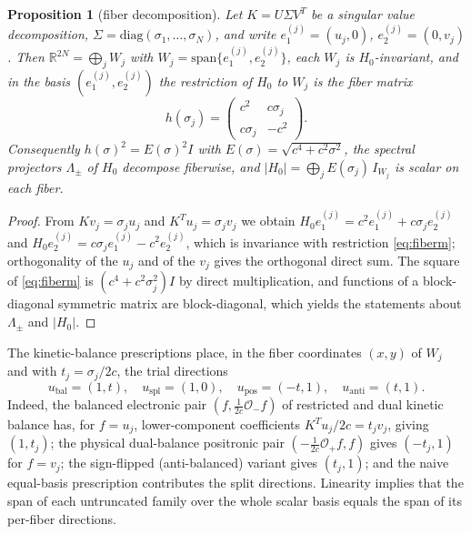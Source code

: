 \documentclass[11pt,reqno]{amsart}
\newtheorem{proposition}[theorem]{Proposition}
\theoremstyle{definition}
\theoremstyle{remark}
\newcommand{\R}{\mathbb{R}}
\newcommand{\Op}{\mathcal{O}}
\begin{document}
\begin{proposition}[fiber decomposition]\label{prop:fiber}
Let $K=U\Sigma V^{T}$ be a singular value decomposition,
$\Sigma=\mathrm{diag}(\sigma_{1},\dots,\sigma_{N})$, and write
$e_{1}^{(j)}=(u_{j},0)$, $e_{2}^{(j)}=(0,v_{j})$. Then
$\R^{2N}=\bigoplus_{j}W_{j}$ with
$W_{j}=\mathrm{span}\{e_{1}^{(j)},e_{2}^{(j)}\}$, each $W_{j}$ is
$H_{0}$-invariant, and in the basis $(e_{1}^{(j)},e_{2}^{(j)})$ the
restriction of $H_{0}$ to $W_{j}$ is the fiber matrix
\begin{equation}
h(\sigma_{j})=
\begin{pmatrix}
c^{2} & c\sigma_{j}\\
c\sigma_{j} & -c^{2}
\end{pmatrix}.
\label{eq:fiberm}
\end{equation}
Consequently $h(\sigma)^{2}=E(\sigma)^{2}I$ with
$E(\sigma)=\sqrt{c^{4}+c^{2}\sigma^{2}}$, the spectral projectors
$\Lambda_{\pm}$ of $H_{0}$ decompose fiberwise, and
$|H_{0}|=\bigoplus_{j}E(\sigma_{j})\,I_{W_{j}}$ is scalar on each fiber.
\end{proposition}

\begin{proof}
From $Kv_{j}=\sigma_{j}u_{j}$ and $K^{T}u_{j}=\sigma_{j}v_{j}$ we obtain
$H_{0}e_{1}^{(j)}=c^{2}e_{1}^{(j)}+c\sigma_{j}e_{2}^{(j)}$ and
$H_{0}e_{2}^{(j)}=c\sigma_{j}e_{1}^{(j)}-c^{2}e_{2}^{(j)}$, which is
invariance with restriction \eqref{eq:fiberm}; orthogonality of the
$u_{j}$ and of the $v_{j}$ gives the orthogonal direct sum. The square
of \eqref{eq:fiberm} is $(c^{4}+c^{2}\sigma_{j}^{2})I$ by direct
multiplication, and functions of a block-diagonal symmetric matrix are
block-diagonal, which yields the statements about $\Lambda_{\pm}$ and
$|H_{0}|$.
\end{proof}

The kinetic-balance prescriptions place, in the fiber coordinates
$(x,y)$ of $W_{j}$ and with $t_{j}=\sigma_{j}/2c$, the trial directions
\begin{equation}
u_{\mathrm{bal}}=(1,t),\quad
u_{\mathrm{spl}}=(1,0),\quad
u_{\mathrm{pos}}=(-t,1),\quad
u_{\mathrm{anti}}=(t,1).
\label{eq:families}
\end{equation}
Indeed, the balanced electronic pair $(f,\tfrac{1}{2c}\Op_{-}f)$ of
restricted and dual kinetic balance has, for $f=u_{j}$, lower-component
coefficients $K^{T}u_{j}/2c=t_{j}v_{j}$, giving $(1,t_{j})$; the
physical dual-balance positronic pair $(-\tfrac{1}{2c}\Op_{+}f,f)$
gives $(-t_{j},1)$ for $f=v_{j}$; the sign-flipped (anti-balanced)
variant gives $(t_{j},1)$; and the naive equal-basis prescription
contributes the split directions. Linearity implies that the span of
each untruncated family over the whole scalar basis equals the span of
its per-fiber directions.
\end{document}
